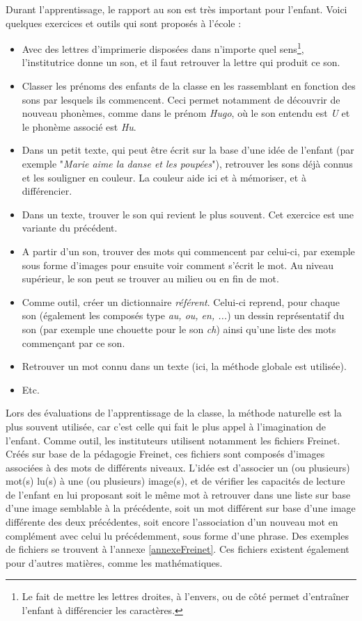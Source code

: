 Durant l'apprentissage, le rapport au son est très important pour l'enfant. Voici quelques exercices et outils qui sont proposés à l'école :
\begin{itemize}
\item Avec des lettres d'imprimerie disposées dans n'importe quel sens\footnote{Le fait de mettre les lettres droites, à l'envers, ou de côté permet d'entraîner l'enfant à différencier les caractères.}, l'institutrice donne un son, et il faut retrouver la lettre qui produit ce son.
\item Classer les prénoms des enfants de la classe en les rassemblant en fonction des sons par lesquels ils commencent. Ceci permet notamment de découvrir de nouveau phonèmes, comme dans le prénom \textit{Hugo}, où le son entendu est \textit{U} et le phonème associé est \textit{Hu}.
\item Dans un petit texte, qui peut être écrit sur la base d'une idée de l'enfant (par exemple "\textit{Marie aime la danse et les poupées}"), retrouver les sons déjà connus et les souligner en couleur. La couleur aide ici et à mémoriser, et à différencier.
\item Dans un texte, trouver le son qui revient le plus souvent. Cet exercice est une variante du précédent.
\item A partir d'un son, trouver des mots qui commencent par celui-ci, par exemple sous forme d'images pour ensuite voir comment s'écrit le mot. Au niveau supérieur, le son peut se trouver au milieu ou en fin de mot.
\item Comme outil, créer un dictionnaire \textit{référent}. Celui-ci reprend, pour chaque son (également les composés type \textit{au, ou, en, ...}) un dessin représentatif du son (par exemple une chouette pour le son \textit{ch}) ainsi qu'une liste des mots commençant par ce son.
\item Retrouver un mot connu dans un texte (ici, la méthode globale est utilisée).
\item Etc.\\
\end{itemize}

Lors des évaluations de l'apprentissage de la classe, la méthode naturelle est la plus souvent utilisée, car c'est celle qui fait le plus appel à l'imagination de l'enfant. Comme outil, les instituteurs utilisent notamment les fichiers Freinet. Créés sur base de la pédagogie Freinet, ces fichiers sont composés d'images associées à des mots de différents niveaux. L'idée est d'associer un (ou plusieurs) mot(s) lu(s) à une (ou plusieurs) image(s), et de vérifier les capacités de lecture de l'enfant en lui proposant soit le même mot à retrouver dans une liste sur base d'une image semblable à la précédente, soit un mot différent sur base d'une image différente des deux précédentes, soit encore l'association d'un nouveau mot en complément avec celui lu précédemment, sous forme d'une phrase. Des exemples de fichiers se trouvent à l'annexe \ref{annexeFreinet}. Ces fichiers existent également pour d'autres matières, comme les mathématiques.\\

